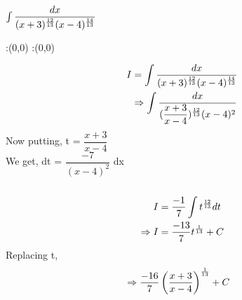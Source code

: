 



\question[5] $\int \dfrac{dx}{(x+3)^{\frac{12}{13}}(x-4)^{\frac{14}{13}}}$


\watchout

\ifprintanswers
  \begin{marginfigure}
      :(0,0)
      :(0,0)
    \figdrawbegin{}
      \figdrawline [100,101]
    \figdrawend
    \figvisu{\figBoxA}{}{%
    }
    \centerline{\box\figBoxA}
  \end{marginfigure}
\fi 

\begin{solution}[\fullpage]
\begin{align}
I &=  \int \dfrac{dx}{(x+3)^{\frac{12}{13}}(x-4)^{\frac{14}{13}}}\\
&\Rightarrow \int \dfrac{dx}{(\dfrac{x+3}{x-4})^{\frac{12}{13}}(x-4)^{2}}
\end{align}
 Now putting, t = $\dfrac{x+3}{x-4}$\\
 We get, dt = $\dfrac{-7}{(x-4)^{2}}$ dx\\  
\\
\begin{align}
              I &= \dfrac{-1}{7} \int t ^{\frac{12}{13}} dt \\
  \Rightarrow I &= \dfrac{-13}{7} t^{\frac{1}{13}} + C 
\end{align}
Replacing t,
\begin{align}
&\Rightarrow \dfrac{-16}{7} \left(\dfrac{x+3}{x-4} \right)^ {\frac{1}{13}} + C
\end{align}
\end{solution}

